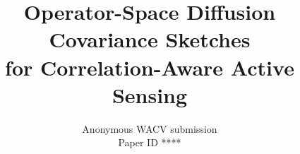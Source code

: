 \documentclass[10pt,twocolumn,letterpaper]{article}
\def\wacvPaperID{****}
\begin{document}
\title{Operator-Space Diffusion Covariance Sketches\\
for Correlation-Aware Active Sensing}
\author{Anonymous WACV submission\\Paper ID \wacvPaperID}
\maketitle









{\small


}
\end{document}
